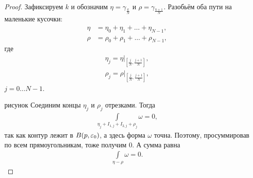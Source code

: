 \begin{proof}
 Зафиксируем $k$ и обозначим $\eta = \gamma_{\frac{k}{N}}$  и $\rho = \gamma_{\frac{k+1}{N}}$. Разобьём оба пути на маленькие кусочки:
 \begin{align*}
  \eta &= \eta_0 + \eta_1 + \ldots + \eta_{N-1}, \\
  \rho &= \rho_0 + \rho_1 + \ldots + \rho_{N-1},
 \end{align*} где
 \begin{align*}
  \eta_j = \eta \rvert_{\left[\frac{j}{N},\frac{j+1}{N}\right]  }, \\
  \rho_j = \rho \rvert_{\left[\frac{j}{N},\frac{j+1}{N}\right]  },
 \end{align*} $j = 0 \ldots N - 1$.

 {\color{red} рисунок} Соединим концы $\eta_j$ и $\rho_j$ отрезками. Тогда
 \begin{align*}
  \int\limits_{\eta_j + I_{1,j} + I_{2,j} + \rho_j} \omega = 0
 ,\end{align*} так как  контур лежит в $B(p,\varepsilon_0)$, а здесь форма $\omega$ точна. Поэтому, просуммировав по всем прямоугольникам, тоже получим $0$. А сумма равна
 \begin{align*}
  \int\limits_{\eta - \rho}  \omega = 0
 .\end{align*} 
\end{proof}

